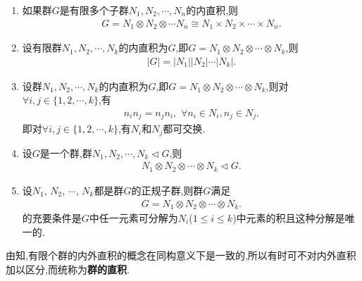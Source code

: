 \documentclass[../../main.tex]{subfiles}%
\begin{document}
\begin{theorem}\label{theorem:群的内直积分解的基本性质}
\begin{enumerate}[(1)]
\item\label{theorem:群的内直积分解的基本性质-0} 如果群$G$是有限多个子群$N_1,N_2,\cdots,N_n$的内直积,则
\begin{align*}
G = N_1\otimes N_2\otimes \cdots N_n\cong N_1\times N_2\times \cdots \times N_n.
\end{align*}

\item\label{theorem:群的内直积分解的基本性质-2} 
设有限群$N_1,N_2,\cdots,N_k$的内直积为$G$,即$G = N_1\otimes N_2\otimes\cdots\otimes N_k$,则
\begin{align*}
|G|=|N_1||N_2|\cdots |N_k|.
\end{align*}

\item\label{theorem:群的内直积分解的基本性质-1} 设群$N_1,N_2,\cdots,N_k$的内直积为$G$,即$G = N_1\otimes N_2\otimes\cdots\otimes N_k$,则对$\forall i,j\in \{1,2,\cdots,k\}$,有
\begin{align*}
n_in_j=n_jn_i,\,\,\forall n_i\in N_i,n_j\in N_j.
\end{align*}
即对$\forall i,j\in \{1,2,\cdots,k\}$,有$N_i$和$N_j$都可交换.

\item\label{theorem:群的内直积分解的基本性质-4} 设$G$是一个群,群$N_1,N_2,\cdots,N_k\lhd G$,则
\begin{align*}
N_1\otimes N_2\otimes\cdots\otimes N_k\lhd G.
\end{align*}

\item\label{theorem:群的内直积分解的基本性质-3} 设$N_1$, $N_2$, $\cdots$, $N_k$都是群$G$的正规子群,则群$G$满足
\begin{align*}
G = N_1\otimes N_2\otimes\cdots\otimes N_k.
\end{align*}
的充要条件是$G$中任一元素可分解为$N_i$($1\leqslant i\leqslant k$)中元素的积且这种分解是唯一的.
\end{enumerate}
\end{theorem}
\begin{remark}
由知,有限个群的内外直积的概念在同构意义下是一致的,所以有时可不对内外直积加以区分,而统称为\textbf{群的直积}.
\end{remark}
\end{document}
